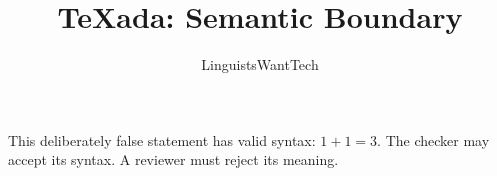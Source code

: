 \documentclass{article}
\title{TeXada: Semantic Boundary}
\author{LinguistsWantTech}
\date{}
\begin{document}
\maketitle
This deliberately false statement has valid syntax: $1+1=3$.
The checker may accept its syntax. A reviewer must reject its meaning.
\end{document}
